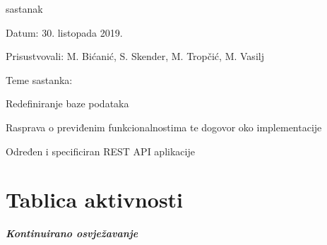 \begin{packed_enum}
			\item  sastanak
			\item[] \begin{packed_item}
				\item Datum: 30. listopada 2019.
				\item Prisustvovali: M. Bićanić, S. Skender, M. Tropčić, M. Vasilj
				\item Teme sastanka:
				\begin{packed_item}
					\item  Redefiniranje baze podataka
					\item  Rasprava o previđenim funkcionalnostima te dogovor oko implementacije
					\item Određen i specificiran REST API aplikacije
				\end{packed_item}
			\end{packed_item}
			
		\end{packed_enum}
		
		\eject
		\section*{Tablica aktivnosti}
		
			\textbf{\textit{Kontinuirano osvježavanje}}\\
			
